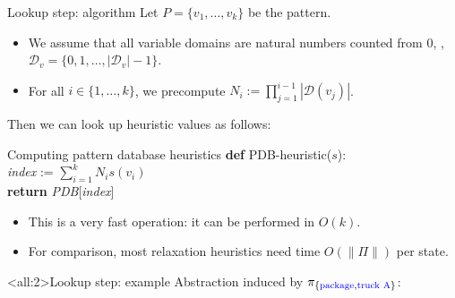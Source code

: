 \documentclass{gkibeamer}
\begin{document}
\begin{frame}{Lookup step: algorithm}
  Let $P = \{v_1, \dots, v_k\}$ be the pattern.
  \begin{itemize}
  \item We assume that all variable domains are natural numbers
    counted from $0$, \ie, $\mathcal D_v = \{0, 1, \dots, |\mathcal
      D_v| - 1\}$.
  \item For all $i \in \{1, \dots, k\}$, we precompute
    $N_i := \prod_{j=1}^{i-1} |\mathcal D(v_j)|$.
  \end{itemize}

  \smallskip

  Then we can look up heuristic values as follows:
  \begin{block}{Computing pattern database heuristics}
    \textbf{def} PDB-heuristic($s$): \\
    {}\qquad \textit{index} := $\sum_{i=1}^k N_i s(v_i)$ \\
    {}\qquad \textbf{return} \textit{PDB}[\textit{index}]
  \end{block}

  \begin{itemize}
  \item This is a \alert{very fast} operation: it can be performed in
    $O(k)$.
  \item For comparison, most relaxation heuristics need time
    $O(\|\Pi\|)$ per state.
  \end{itemize}
\end{frame}

\begin{frame}<all:2>{Lookup step: example}
  Abstraction induced by $\pi_{\{\text{{\color{blue} package}},
    \text{{\color{blue} truck A}}\}}$:
  \begin{center}
    \picprojectionpackagetruck
  \end{center}
\end{frame}
\end{document}
